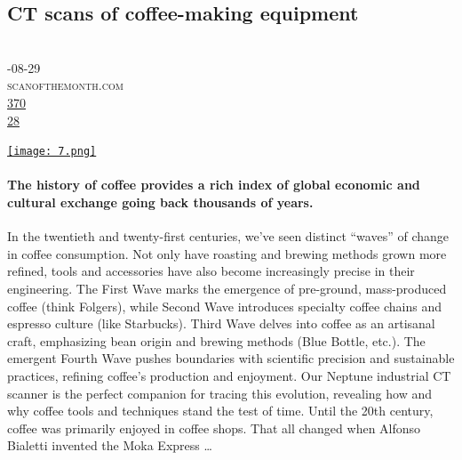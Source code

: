\documentclass[10pt,a4paper]{article}
\begin{document}
\subsection{CT scans of coffee-making equipment}
\noindent\begin{minipage}[t]{0.19\linewidth}
\vspace{0pt}
\noindent\scshape\footnotesize
\\ {\scriptsize\faCalendar}-08-29
\\ {\scriptsize\faGlobe}\space 
scanofthemonth.com
\\ {\scriptsize\faThumbsOUp}\space 
\href{http://news.ycombinator.com/item?id=37341799\&utm\_term=comment}{370} 
\\ {\scriptsize\faComments}\space 
\href{http://news.ycombinator.com/item?id=37341799\&utm\_term=comment}{28} 
\end{minipage} 
\begin{minipage}[t]{0.80\linewidth}
\vspace{0pt}
\begin{multicols}{2}
    \href{https://www.scanofthemonth.com/scans/coffee?utm\_source=hackernewsletter\&utm\_medium=email\&utm\_term=fav}{
        \texttt{[image: 7.png]}
    }
\paragraph{The history of coffee provides a rich index of global economic and cultural exchange going back thousands of years.}
 In the twentieth and twenty-first centuries, we’ve seen distinct “waves” of change in coffee consumption. Not only have roasting and brewing methods grown more refined, tools and accessories have also become increasingly precise in their engineering.
The First Wave marks the emergence of pre-ground, mass-produced coffee (think Folgers), while Second Wave introduces specialty coffee chains and espresso culture (like Starbucks). Third Wave delves into coffee as an artisanal craft, emphasizing bean origin and brewing methods (Blue Bottle, etc.). The emergent Fourth Wave pushes boundaries with scientific precision and sustainable practices, refining coffee’s production and enjoyment.
Our Neptune industrial CT scanner is the perfect companion for tracing this evolution, revealing how and why coffee tools and techniques stand the test of time.
Until the 20th century, coffee was primarily enjoyed in coffee shops. That all changed when Alfonso Bialetti invented the Moka Express
\dots
\end{multicols}
\end{minipage}
\par\medskip
\end{document}
